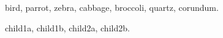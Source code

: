 \documentclass{article}
\begin{document}
\gls{bird}, \gls{parrot}, \gls{zebra}, \gls{cabbage},
\gls{broccoli}, \gls{quartz}, \gls{corundum}.

\gls{child1a}, \gls{child1b}, \gls{child2a}, \gls{child2b}.

\printunsrtglossary
\end{document}
